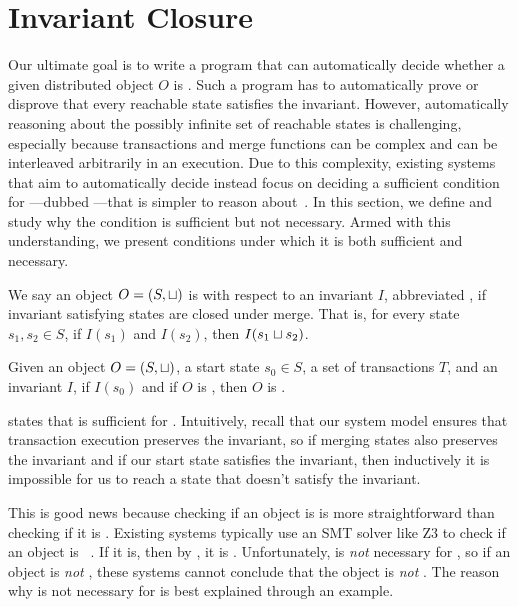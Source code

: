 \section{Invariant Closure}
Our ultimate goal is to write a program that can automatically decide whether a
given distributed object $O$ is \sTIconfluent{}. Such a program has to
automatically prove or disprove that every reachable state satisfies the
invariant. However, automatically reasoning about the possibly infinite set of
reachable states is challenging, especially because transactions and merge
functions can be complex and can be interleaved arbitrarily in an execution.
Due to this complexity, existing systems that aim to automatically decide
\invariantconfluence{} instead focus on deciding a sufficient condition for
\invariantconfluence{}---dubbed ---that is simpler
to reason about~\cite{li2012making, li2014automating}. In this section, we
define \invariantclosure{} and study why the condition is sufficient but not
necessary.  Armed with this understanding, we present conditions under which it
is both sufficient and necessary.

We say an object $O = (S, \sqcup)$ is  with respect
to an invariant $I$, abbreviated , if invariant satisfying
states are closed under merge. That is, for every state $s_1, s_2 \in S$, if
$I(s_1)$ and $I(s_2)$, then $I(s_1 \sqcup s_2)$.

\begin{theorem}
  Given an object $O = (S, \sqcup)$, a start state $s_0 \in S$, a set of
  transactions $T$, and an invariant $I$, if $I(s_0)$ and if $O$ is \Iclosed{},
  then $O$ is \sTIconfluent{}.
\end{theorem}

 states that \invariantclosure{} is
sufficient for \invariantconfluence{}. Intuitively, recall that our system model ensures
that transaction execution preserves the invariant, so if merging states also
preserves the invariant and if our start state satisfies the invariant, then
inductively it is impossible for us to reach a state that doesn't satisfy the
invariant.

This is good news because checking if an object is \invariantclosed{} is more
straightforward than checking if it is \invariantconfluent{}. Existing systems
typically use an SMT solver like Z3 to check if an object is
\invariantclosed{}~\cite{de2008z3, balegas2015putting, gotsman2016cause}. If it
is, then by , it is \invariantconfluent{}.
Unfortunately, \invariantclosure{} is \emph{not} necessary for
\invariantconfluence{}, so if an object is \emph{not} \invariantclosed{}, these
systems cannot conclude that the object is \emph{not} \invariantconfluent{}.
The reason why \invariantclosure{} is not necessary for \invariantconfluence{}
is best explained through an example.

